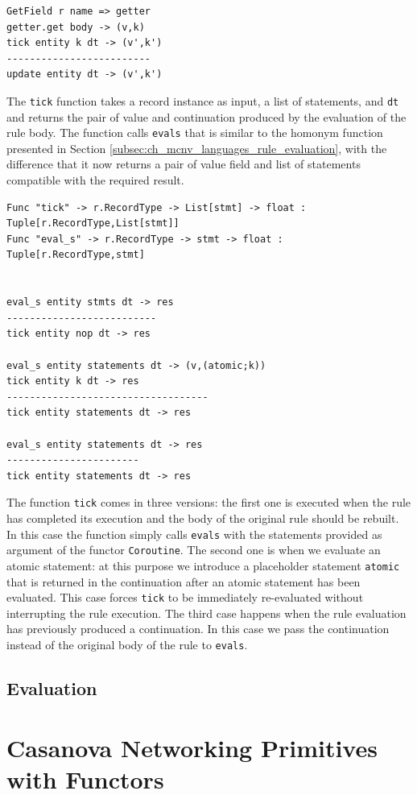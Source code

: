 \begin{lstlisting}
GetField r name => getter
getter.get body -> (v,k)
tick entity k dt -> (v',k')
-------------------------
update entity dt -> (v',k')
\end{lstlisting}

\noindent
The \texttt{tick} function takes a record instance as input, a list of statements, and \texttt{dt} and returns the pair of value and continuation produced by the evaluation of the rule body. The function calls \texttt{eval\tu s} that is similar to the homonym function presented in Section \ref{subsec:ch_mcnv_languages_rule_evaluation}, with the difference that it now returns a pair of value field and list of statements compatible with the required result.

\begin{lstlisting}
Func "tick" -> r.RecordType -> List[stmt] -> float : Tuple[r.RecordType,List[stmt]]
Func "eval_s" -> r.RecordType -> stmt -> float : Tuple[r.RecordType,stmt]


eval_s entity stmts dt -> res
--------------------------
tick entity nop dt -> res

eval_s entity statements dt -> (v,(atomic;k))
tick entity k dt -> res
-----------------------------------
tick entity statements dt -> res

eval_s entity statements dt -> res
-----------------------
tick entity statements dt -> res
\end{lstlisting}

\noindent
The function \texttt{tick} comes in three versions: the first one is executed when the rule has completed its execution and the body of the original rule should be rebuilt. In this case the function simply calls \texttt{eval\tu s} with the statements provided as argument of the functor \texttt{Coroutine}. The second one is when we evaluate an atomic statement: at this purpose we introduce a placeholder statement \texttt{atomic} that is returned in the continuation after an atomic statement has been evaluated. This case forces \texttt{tick} to be immediately re-evaluated without interrupting the rule execution. The third case happens when the rule evaluation has previously produced a continuation. In this case we pass the continuation instead of the original body of the rule to \texttt{eval\tu s}.

\subsection{Evaluation}
\label{subsec:ch_networking_evaluation}

\section{Casanova Networking Primitives with Functors}
\label{sec:ch_networking_functor_networking}